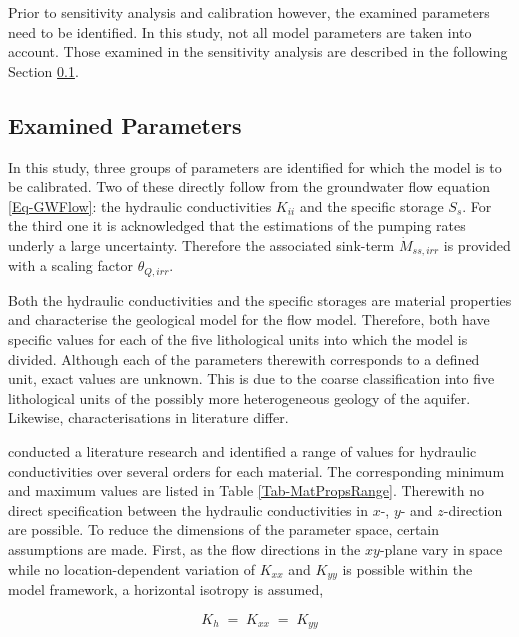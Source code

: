 Prior to sensitivity analysis and calibration however, the examined parameters need to be identified. 
In this study, not all model parameters are taken into account. 
Those examined in the sensitivity analysis are described in the following Section \ref{Sec-SubMethParams}.


\subsection{Examined Parameters}
\label{Sec-SubMethParams}

In this study, three groups of parameters are identified for which the model is to be calibrated. 
Two of these directly follow from the groundwater flow equation \eqref{Eq-GWFlow}: the hydraulic conductivities $K_{ii}$ and the specific storage $S_s$. 
For the third one it is acknowledged that the estimations of the pumping rates underly a large uncertainty. 
Therefore the associated sink-term $\dot{M}_{ss,irr}$ is provided with a scaling factor $\theta_{Q,irr}$.

Both the hydraulic conductivities and the specific storages are material properties and characterise the geological model for the flow model. 
Therefore, both have specific values for each of the five lithological units into which the model is divided. 
Although each of the parameters therewith corresponds to a defined unit, exact values are unknown. 
This is due to the coarse classification into five lithological units of the possibly more heterogeneous geology of the aquifer. 
Likewise, characterisations in literature differ.

\textcite{Horn.2021} conducted a literature research and identified a range of values for hydraulic conductivities over several orders for each material. 
The corresponding minimum and maximum values are listed in Table \ref{Tab-MatPropsRange}. 
Therewith no direct specification between the hydraulic conductivities in $x$-, $y$- and $z$-direction are possible. 
To reduce the dimensions of the parameter space, certain assumptions are made. 
First, as the flow directions in the $xy$-plane vary in space while no location-dependent variation of $K_{xx}$ and $K_{yy}$ is possible within the model framework, a horizontal isotropy is assumed,

\begin{equation}
    K_h \; = \; K_{xx} \; = \; K_{yy}
\end{equation}

